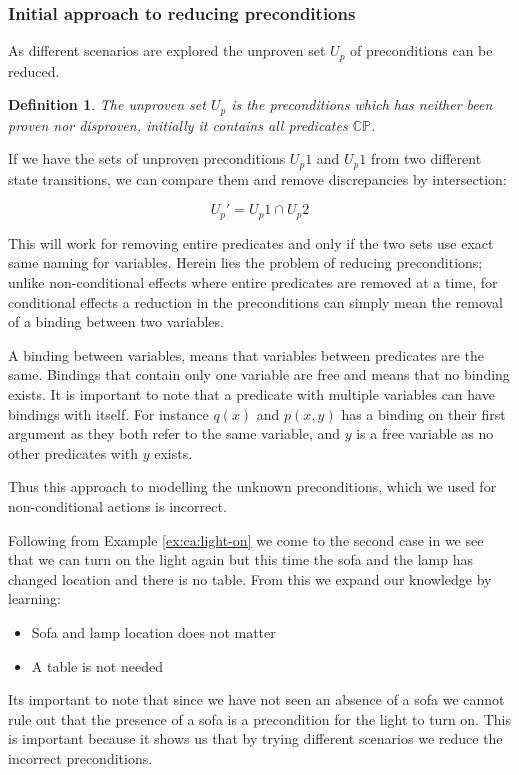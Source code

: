 \documentclass[../Master.tex]{subfiles}
\begin{document}
\subsubsection{Initial approach to reducing preconditions}
As different scenarios are explored the unproven set $U_p$ of preconditions can be reduced.
\newtheorem{thm-unknown-set}{Definition}
\begin{thm-unknown-set}
The unproven set $U_p$ is the preconditions which has neither been proven nor disproven, initially it contains all  predicates $\mathbb{CP}$.
\end{thm-unknown-set}

If we have the sets of unproven preconditions $U_p1$ and $U_p1$ from two different state transitions, we can compare them and remove discrepancies by intersection:

\begin{equation}
\label{eq:unknownpredcondset}
	U_p' = U_p1 \cap U_p2
\end{equation}

This will work for removing entire predicates and only if the two sets use exact same naming for variables. Herein lies the problem of reducing preconditions; unlike non-conditional effects where entire predicates are removed at a time, for conditional effects a reduction in the preconditions can simply mean the removal of a binding between two variables.
\begin{definition}
	A binding between variables, means that variables between predicates are the same.
	Bindings that contain only one variable are free and means that no binding exists.
	It is important to note that a predicate with multiple variables can have bindings with itself.
	For instance $q(x)$ and $p(x,y)$ has a binding on their first argument as they both refer to the same variable, and $y$ is a free variable as no other predicates with $y$ exists.
\end{definition}
Thus this approach to modelling the unknown preconditions, which we used for non-conditional actions is incorrect.

\begin{example}\label{ex:ca:light-on-2}
    Following from Example \ref{ex:ca:light-on} we come to the second case in 
    we see that we can turn on the light again but this time the sofa and the lamp has changed location and
    there is no table. From this we expand our knowledge by learning:
    \begin{itemize}
        \item Sofa and lamp location does not matter
        \item A table is not needed
    \end{itemize}
    Its important to note that since we have not seen an absence of a sofa we cannot rule out that the presence of a sofa is a precondition for the light to turn on. This is important because it shows us that by trying different scenarios we reduce the incorrect preconditions.
\end{example}
\end{document}
